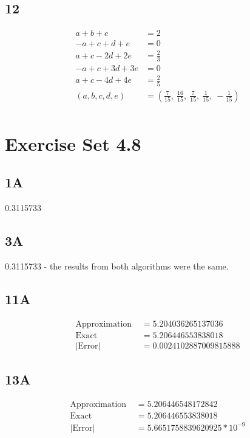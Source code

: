 \documentclass{oisinclass}
\begin{document}
\subsection*{12}
\begin{align*}
	a + b + c           & = 2                                                                                                 \\
	- a + c + d + e     & = 0                                                                                                 \\
	a + c - 2 d + 2 e   & = \frac{2}{3}                                                                                       \\
	- a + c + 3 d + 3 e & = 0                                                                                                 \\
	a + c - 4 d + 4 e   & = \frac{2}{5}                                                                                       \\
	(a, b, c, d, e)     & = \left( \frac{7}{15}, \  \frac{16}{15}, \  \frac{7}{15}, \  \frac{1}{15}, \  - \frac{1}{15}\right) \\
\end{align*}

\section*{Exercise Set 4.8}
\subsection*{1A}
0.3115733
\subsection*{3A}
0.3115733 - the results from both algorithms were the same.
\subsection*{11A}
\begin{align*}
	\text{Approximation } &= 5.204036265137036 \\
	\text{Exact } &= 5.206446553838018 \\
	|\text{Error}| &= 0.0024102887009815888
\end{align*}
\subsection*{13A}
\begin{align*}
	\text{Approximation } &= 5.206446548172842 \\
	\text{Exact } &= 5.206446553838018 \\
	|\text{Error}| &= 5.6651758839620925 * 10^{-9}
\end{align*}
\end{document}
